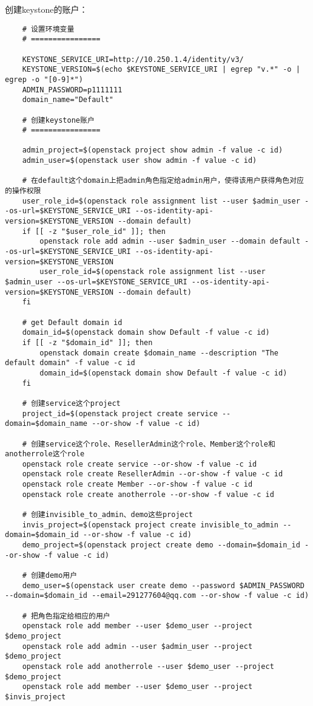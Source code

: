 \documentclass[a4paper,left=1.5cm,right=1.5cm,11pt]{article}
\begin{document}
	创建keystone的账户：
	\begin{lstlisting}
	# 设置环境变量
	# ================

	KEYSTONE_SERVICE_URI=http://10.250.1.4/identity/v3/
	KEYSTONE_VERSION=$(echo $KEYSTONE_SERVICE_URI | egrep "v.*" -o | egrep -o "[0-9]*")
	ADMIN_PASSWORD=p1111111
	domain_name="Default"

	# 创建keystone账户
	# ================

	admin_project=$(openstack project show admin -f value -c id)
	admin_user=$(openstack user show admin -f value -c id)

	# 在default这个domain上把admin角色指定给admin用户，使得该用户获得角色对应的操作权限
	user_role_id=$(openstack role assignment list --user $admin_user --os-url=$KEYSTONE_SERVICE_URI --os-identity-api-version=$KEYSTONE_VERSION --domain default)
	if [[ -z "$user_role_id" ]]; then
		openstack role add admin --user $admin_user --domain default --os-url=$KEYSTONE_SERVICE_URI --os-identity-api-version=$KEYSTONE_VERSION
		user_role_id=$(openstack role assignment list --user $admin_user --os-url=$KEYSTONE_SERVICE_URI --os-identity-api-version=$KEYSTONE_VERSION --domain default)
	fi
	
	# get Default domain id
	domain_id=$(openstack domain show Default -f value -c id)
	if [[ -z "$domain_id" ]]; then
		openstack domain create $domain_name --description "The default domain" -f value -c id
		domain_id=$(openstack domain show Default -f value -c id)
	fi

	# 创建service这个project
	project_id=$(openstack project create service --domain=$domain_name --or-show -f value -c id)

	# 创建service这个role、ResellerAdmin这个role、Member这个role和anotherrole这个role
	openstack role create service --or-show -f value -c id
	openstack role create ResellerAdmin --or-show -f value -c id
	openstack role create Member --or-show -f value -c id
	openstack role create anotherrole --or-show -f value -c id
	
	# 创建invisible_to_admin、demo这些project
	invis_project=$(openstack project create invisible_to_admin --domain=$domain_id --or-show -f value -c id)
	demo_project=$(openstack project create demo --domain=$domain_id --or-show -f value -c id)

	# 创建demo用户
	demo_user=$(openstack user create demo --password $ADMIN_PASSWORD --domain=$domain_id --email=291277604@qq.com --or-show -f value -c id)

	# 把角色指定给相应的用户
	openstack role add member --user $demo_user --project $demo_project
	openstack role add admin --user $admin_user --project $demo_project
	openstack role add anotherrole --user $demo_user --project $demo_project
	openstack role add member --user $demo_user --project $invis_project
	

\end{lstlisting}
\end{document}

